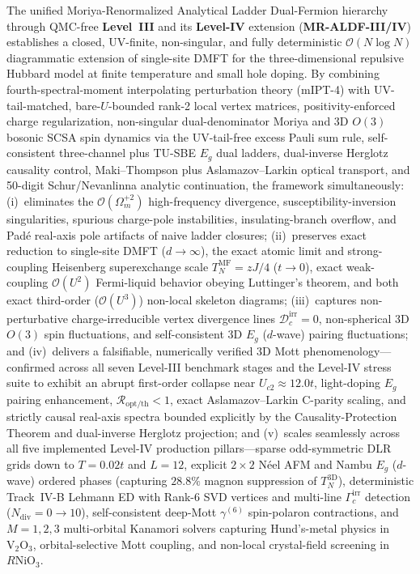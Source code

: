 \documentclass[11pt,a4paper]{article}
\numberwithin{equation}{section}
\theoremstyle{plain}
\theoremstyle{definition}
\begin{document}
The unified Moriya-Renormalized Analytical Ladder Dual-Fermion hierarchy through QMC-free
\textbf{Level~III} and its \textbf{Level-IV} extension (\textbf{MR-ALDF-III/IV})
establishes a closed, UV-finite, non-singular, and fully deterministic $\mathcal{O}(N\log N)$
diagrammatic extension of single-site DMFT for the three-dimensional repulsive Hubbard
model at finite temperature and small hole doping. By combining fourth-spectral-moment
interpolating perturbation theory (mIPT-4) with UV-tail-matched, bare-$U$-bounded rank-2
local vertex matrices, positivity-enforced charge regularization, non-singular
dual-denominator Moriya and 3D $O(3)$ bosonic SCSA spin dynamics via the UV-tail-free
excess Pauli sum rule, self-consistent three-channel plus TU-SBE $E_g$ dual ladders,
dual-inverse Herglotz causality control, Maki--Thompson plus Aslamazov--Larkin optical
transport, and 50-digit Schur/Nevanlinna analytic continuation, the framework
simultaneously: (i)~eliminates the $\mathcal{O}(\Omega_m^{+2})$ high-frequency
divergence, susceptibility-inversion singularities, spurious charge-pole instabilities,
insulating-branch overflow, and Pad\'e real-axis pole artifacts of naive ladder closures;
(ii)~preserves exact reduction to single-site DMFT ($d \to \infty$), the exact atomic
limit and strong-coupling Heisenberg superexchange scale $T_N^{\mathrm{MF}} = zJ/4$
($t \to 0$), exact weak-coupling $\mathcal{O}(U^2)$ Fermi-liquid behavior obeying
Luttinger's theorem, and both exact third-order ($\mathcal{O}(U^3)$) non-local skeleton
diagrams; (iii)~captures non-perturbative charge-irreducible vertex divergence lines
$\mathcal{D}_c^{\mathrm{irr}} = 0$, non-spherical 3D $O(3)$ spin fluctuations, and
self-consistent 3D $E_g$ ($d$-wave) pairing fluctuations; and (iv)~delivers a falsifiable,
numerically verified 3D Mott phenomenology---confirmed across all seven Level-III
benchmark stages and the Level-IV stress suite to exhibit an abrupt first-order collapse
near $U_{c2} \approx 12.0t$, light-doping $E_g$ pairing enhancement,
$\mathcal{R}_{\mathrm{opt/th}} < 1$, exact Aslamazov--Larkin C-parity scaling, and
strictly causal real-axis spectra bounded explicitly by the Causality-Protection Theorem
and dual-inverse Herglotz projection; and (v)~scales seamlessly across all five implemented
Level-IV production pillars---sparse odd-symmetric DLR grids down to $T = 0.02t$ and $L = 12$,
explicit $2\times 2$ N\'eel AFM and Nambu $E_g$ ($d$-wave) ordered phases (capturing $28.8\%$
magnon suppression of $T_N^{\mathrm{3D}}$), deterministic Track~IV-B Lehmann ED with Rank-6 SVD
vertices and multi-line $\Gamma_c^{\mathrm{irr}}$ detection ($N_{\mathrm{div}} = 0 \to 10$),
self-consistent deep-Mott $\gamma^{(6)}$ spin-polaron contractions, and $M = 1,2,3$
multi-orbital Kanamori solvers capturing Hund's-metal physics in $\mathrm{V}_2\mathrm{O}_3$,
orbital-selective Mott coupling, and non-local crystal-field screening in $R\mathrm{NiO}_3$.
\end{document}
